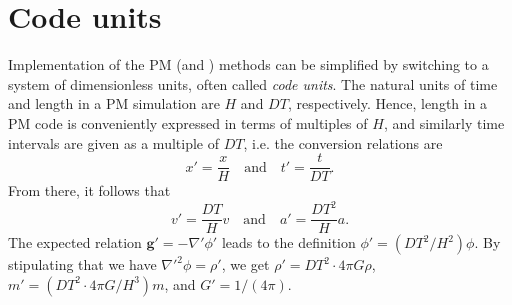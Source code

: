 \section{Code units}
Implementation of the PM (and \PThreeM{}) methods can be simplified by switching to a system of dimensionless units, often called \textit{code units}.
The natural units of time and length in a PM simulation are $H$ and $DT$, respectively.
Hence, length in a PM code is conveniently expressed in terms of multiples of $H$, and similarly time intervals are given as a multiple of $DT$, i.e. the conversion relations are
\begin{equation*}
    x' = \frac{x}{H} \quad \text{and} \quad t' = \frac{t}{DT}.
\end{equation*}
From there, it follows that
\begin{equation*}
    v' = \frac{DT}{H}v \quad \text{and} \quad a' = \frac{DT^2}{H}a.
\end{equation*}
The expected relation $\mathbf{g}' = -\nabla' \phi'$ leads to the definition $\phi' = (DT^2 / H^2)\phi$.
By stipulating that we have $\nabla'^2\phi = \rho'$, we get $\rho' = DT^2 \cdot 4\pi G\rho$, $m' = (DT^2\cdot 4\pi G / H^3) m$, and $G' = 1/(4\pi)$.
